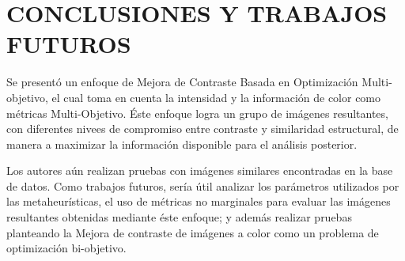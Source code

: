 \chapter{CONCLUSIONES Y TRABAJOS\\ FUTUROS}
\label{sec:conclusion}

Se presentó un enfoque de Mejora de Contraste Basada en Optimización Multi-objetivo, el cual toma en cuenta la intensidad y la información de color como métricas Multi-Objetivo. Éste enfoque logra un grupo de imágenes resultantes, con diferentes nivees de compromiso entre contraste y similaridad estructural, de manera a maximizar la información disponible para el análisis posterior.

Los autores aún realizan pruebas con imágenes similares encontradas en la base de datos. Como trabajos futuros, sería útil analizar los parámetros utilizados por las metaheurísticas, el uso de métricas no marginales para evaluar las imágenes resultantes obtenidas mediante éste enfoque; y además realizar pruebas planteando la Mejora de contraste de imágenes a color como un problema de optimización bi-objetivo.





